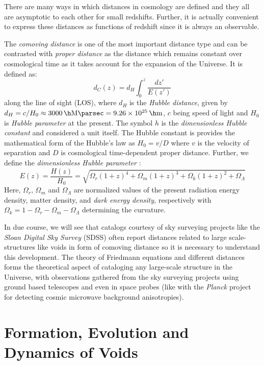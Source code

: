 \documentclass[fleqn,usenatbib]{mnras}
\begin{document}
There are many ways in which distances in cosmology are defined and they all are asymptotic to each other for small redshifts. Further, it is actually convenient to express these distances as functions of redshift since it is always an observable.

The \textit{comoving distance} is one of the most important distance type and can be contrasted with \textit{proper distance} as the distance which remains constant over cosmological time as it takes account for the expansion of the Universe. It is defined as:
\begin{equation}\label{key}
	d_C (z) = d_H \int_0^z \dfrac{dz'}{E(z')}
\end{equation}
along the line of sight (LOS), where $ d_H $ is the \textit{Hubble distance}, given by $ d_H = c/H_0 \approx \SI{3000}{\per \h \mega \parsec} = \SI{9.26e25}{\per \h \meter} $, $ c $ being speed of light and $ H_0 $ is \textit{Hubble parameter} at the present. The symbol $ h $ is the \textit{dimensionless Hubble constant} and considered a unit itself. The Hubble constant is provides the mathematical form of the Hubble's law as $ H_0 = v/D $ where $ v $ is the velocity of separation and $ D $ is cosmological time-dependent proper distance. Further, we define the \textit{dimensionless Hubble parameter} \citep{peebles_principles_1993}:
\begin{equation}\label{key}
	E (z) = \dfrac{H(z)}{H_0} = \sqrt{\Omega_r (1+z)^4 + \Omega_m (1+z)^3 + \Omega_k(1+z)^2 + \Omega_{\Lambda}}
\end{equation}
Here, $ \Omega_{r} $, $ \Omega_{m} $ and $ \Omega_{\Lambda} $ are normalized values of the present radiation energy density, matter density, and \textit{dark energy density,} respectively with $ \Omega_k = 1 - \Omega_{r} - \Omega_{m} - \Omega_{\Lambda}$ determining the curvature. 

In due course, we will see that catalogs courtesy of sky surveying projects like the \textit{Sloan Digital Sky Survey} (SDSS) often report distances related to large scale-structures like voids in form of comoving distance so it is necessary to understand this development. The theory of Friedmann equations and different distances forms the theoretical aspect of cataloging any large-scale structure in the Universe, with observations gathered from the sky surveying projects using ground based telescopes and even in space probes (like with the \textit{Planck} project for detecting cosmic microwave background anisotropies).


\section{Formation, Evolution and Dynamics of Voids}
\end{document}

